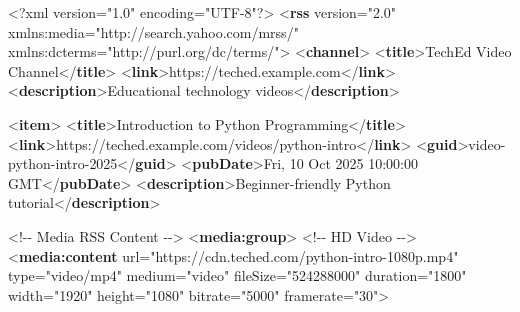 \documentclass[
  letterpaper,
  DIV=11,
  numbers=noendperiod]{scrartcl}
\newenvironment{Shaded}{\begin{snugshade}}{\end{snugshade}}
\newcommand{\CommentTok}[1]{\textcolor[rgb]{0.37,0.37,0.37}{#1}}
\newcommand{\FunctionTok}[1]{\textcolor[rgb]{0.28,0.35,0.67}{#1}}
\newcommand{\KeywordTok}[1]{\textcolor[rgb]{0.00,0.23,0.31}{\textbf{#1}}}
\newcommand{\NormalTok}[1]{\textcolor[rgb]{0.00,0.23,0.31}{#1}}
\newcommand{\OtherTok}[1]{\textcolor[rgb]{0.00,0.23,0.31}{#1}}
\newcommand{\StringTok}[1]{\textcolor[rgb]{0.13,0.47,0.30}{#1}}
\begin{document}
\begin{Shaded}
\begin{Highlighting}[]
\FunctionTok{\textless{}?xml}\OtherTok{ version=}\StringTok{"1.0"}\OtherTok{ encoding=}\StringTok{"UTF{-}8"}\FunctionTok{?\textgreater{}}
\NormalTok{\textless{}}\KeywordTok{rss}\OtherTok{ version=}\StringTok{"2.0"} 
\OtherTok{     xmlns:media=}\StringTok{"http://search.yahoo.com/mrss/"}
\OtherTok{     xmlns:dcterms=}\StringTok{"http://purl.org/dc/terms/"}\NormalTok{\textgreater{}}
\NormalTok{  \textless{}}\KeywordTok{channel}\NormalTok{\textgreater{}}
\NormalTok{    \textless{}}\KeywordTok{title}\NormalTok{\textgreater{}TechEd Video Channel\textless{}/}\KeywordTok{title}\NormalTok{\textgreater{}}
\NormalTok{    \textless{}}\KeywordTok{link}\NormalTok{\textgreater{}https://teched.example.com\textless{}/}\KeywordTok{link}\NormalTok{\textgreater{}}
\NormalTok{    \textless{}}\KeywordTok{description}\NormalTok{\textgreater{}Educational technology videos\textless{}/}\KeywordTok{description}\NormalTok{\textgreater{}}
    
\NormalTok{    \textless{}}\KeywordTok{item}\NormalTok{\textgreater{}}
\NormalTok{      \textless{}}\KeywordTok{title}\NormalTok{\textgreater{}Introduction to Python Programming\textless{}/}\KeywordTok{title}\NormalTok{\textgreater{}}
\NormalTok{   \textless{}}\KeywordTok{link}\NormalTok{\textgreater{}https://teched.example.com/videos/python{-}intro\textless{}/}\KeywordTok{link}\NormalTok{\textgreater{}}
\NormalTok{      \textless{}}\KeywordTok{guid}\NormalTok{\textgreater{}video{-}python{-}intro{-}2025\textless{}/}\KeywordTok{guid}\NormalTok{\textgreater{}}
\NormalTok{   \textless{}}\KeywordTok{pubDate}\NormalTok{\textgreater{}Fri, 10 Oct 2025 10:00:00 GMT\textless{}/}\KeywordTok{pubDate}\NormalTok{\textgreater{}}
\NormalTok{      \textless{}}\KeywordTok{description}\NormalTok{\textgreater{}Beginner{-}friendly Python tutorial\textless{}/}\KeywordTok{description}\NormalTok{\textgreater{}}
      
      \CommentTok{\textless{}!{-}{-} Media RSS Content {-}{-}\textgreater{}}
\NormalTok{      \textless{}}\KeywordTok{media:group}\NormalTok{\textgreater{}}
        \CommentTok{\textless{}!{-}{-} HD Video {-}{-}\textgreater{}}
\NormalTok{        \textless{}}\KeywordTok{media:content} 
\OtherTok{            url=}\StringTok{"https://cdn.teched.com/python{-}intro{-}1080p.mp4"}
\OtherTok{    type=}\StringTok{"video/mp4"}
\OtherTok{      medium=}\StringTok{"video"}
\OtherTok{        fileSize=}\StringTok{"524288000"}
\OtherTok{            duration=}\StringTok{"1800"}
\OtherTok{          width=}\StringTok{"1920"}
\OtherTok{     height=}\StringTok{"1080"}
\OtherTok{    bitrate=}\StringTok{"5000"}
\OtherTok{            framerate=}\StringTok{"30"}\NormalTok{\textgreater{}}
 

\end{Highlighting}
\end{Shaded}
\end{document}
